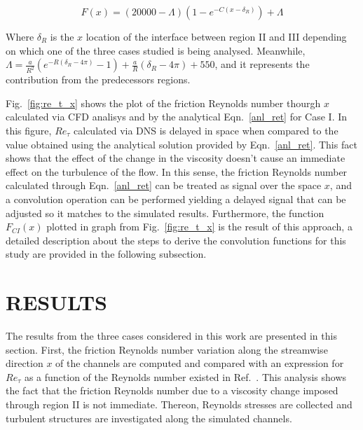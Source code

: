 \documentclass[twocolumn,10pt]{asme2e}
\begin{document}
\begin{equation}
F(x)= (20000-{\Lambda})(1-e^{-C(x-{\delta}_{R})})+{\Lambda}
\label{conv_region3}
\end{equation}

Where \({\delta}_{R}\) is the \(x\) location of the interface between region II and III depending on which one of the three cases studied is being analysed. Meanwhile, \({\Lambda}=\frac{a}{R^2}(e^{-R({\delta}_{R}-4{\pi})}-1)+\frac{a}{R}({\delta}_{R}-4{\pi})+550\), and it represents the contribution from the predecessors regions.

Fig.~\ref{fig:re_t_x} shows the plot of the friction Reynolds number thourgh \(x\) calculated via CFD analisys and by the analytical Eqn.~\ref{anl_ret} for Case I. In this figure, \(Re_{\tau}\) calculated via DNS is delayed in space when compared to the value obtained using the analytical solution provided by Eqn.~\ref{anl_ret}. This fact shows that the effect of the change in the viscosity doesn't cause an immediate effect on the turbulence of the flow. In this sense, the friction Reynolds number calculated through Eqn.~\ref{anl_ret} can be treated as signal over the space \(x\), and a convolution operation can be performed yielding a delayed signal that can be adjusted so it matches to the simulated results. Furthermore, the function \(F_{CI}(x)\) plotted in graph from Fig.~\ref{fig:re_t_x} is the result of this approach, a detailed description about the steps to derive the convolution functions for this study are provided in the following subsection.


\section*{RESULTS}

The results from the three cases considered in this work are presented in this section. First, the friction Reynolds number variation along the streamwise direction \(x\) of the channels are computed and compared with an expression for \(Re_{\tau}\) as a function of the Reynolds number existed in Ref.~\cite{pope}. This analysis shows the fact that the friction Reynolds number due to a viscosity change imposed through region II is not immediate. Thereon, Reynolds stresses are collected and turbulent structures are investigated along the simulated channels.

\end{document}
